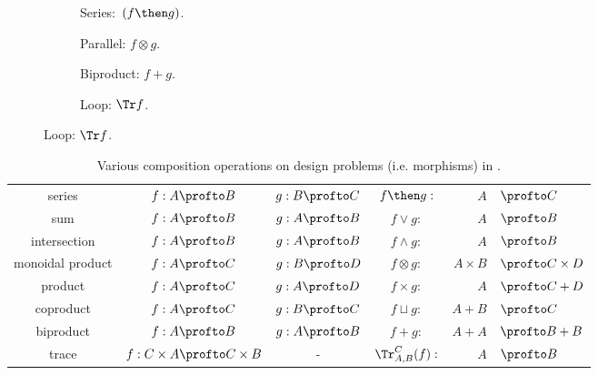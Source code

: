 \begin{figure}[h!]
\centering
\begin{subfigure}{0.2\textwidth}
\centering
{}
\caption{Series:~$(f \then g)$.}
\end{subfigure}
\hspace{10mm} %
\begin{subfigure}{0.2\textwidth}
\centering
{}
\caption{Parallel: $f \otimes g$.}
\end{subfigure}
\hspace{10mm} %
\begin{subfigure}{0.2\textwidth}
\centering
{}
\caption{Biproduct: $f + g$.}
\end{subfigure}
\hspace{10mm} %
\begin{subfigure}{0.2\textwidth}
\centering
{}
\caption{Loop: $\Tr f$.}
\end{subfigure}
\label{fig:diagrams}
\end{figure}

\begin{table}[t!]
    \centering
\begin{tabular}{c|c|c|crl}
    series &
    $f:A\profto B$&
    $g:B\profto C$&
    $f\then g:$&$A$&$\profto C$ \\
    sum &
    $f:A\profto B$ &
    $g:A\profto B$ &
    $f\vee g:$&$A$&$\profto B$ \\
    intersection &
    $f:A\profto B$ &
    $g:A\profto B$ &
    $f\wedge g:$&$A$&$\profto B$ \\
    monoidal product &
    $f:A\profto C$&
    $g:B\profto D$ &
    $f\otimes g:$&$A\times B$&$\profto C \times D$ \\
    product &
    $f:A\profto C$&
    $g:A\profto D$ &
    $f\times g:$&$A $&$\profto C + D$ \\
    coproduct &
    $f:A\profto C$&
    $g:B\profto C$ &
    $f\sqcup g:$&$A + B $&$\profto C$ \\
    biproduct &
    $f:A\profto B$ &
    $g:A\profto B$ &
    $f+ g:$&$A + A$&$\profto B + B$ \\
    trace &
    $f: C \times A \profto C \times B$ &
    -&
    $\Tr_{A,B}^C(f) :$&$A$&$\profto B$
\end{tabular}
    \caption{Various composition operations on design problems (i.e. morphisms) in \DP.}
\end{table}
